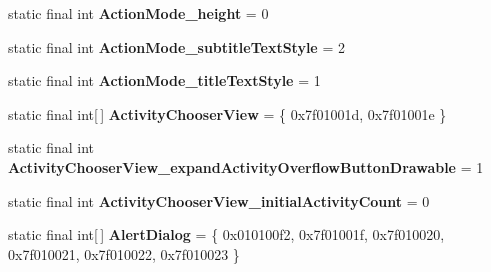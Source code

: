 \begin{DoxyCompactItemize}
\item 
\hypertarget{classandroid_1_1support_1_1design_1_1_r_1_1styleable_a14760d08c455c5f160e63389c6e0a2a8}{}static final int {\bfseries Action\+Mode\+\_\+height} = 0\label{classandroid_1_1support_1_1design_1_1_r_1_1styleable_a14760d08c455c5f160e63389c6e0a2a8}

\item 
\hypertarget{classandroid_1_1support_1_1design_1_1_r_1_1styleable_a10bc3c198873b4b55ca3d7a3a03b0b3d}{}static final int {\bfseries Action\+Mode\+\_\+subtitle\+Text\+Style} = 2\label{classandroid_1_1support_1_1design_1_1_r_1_1styleable_a10bc3c198873b4b55ca3d7a3a03b0b3d}

\item 
\hypertarget{classandroid_1_1support_1_1design_1_1_r_1_1styleable_a00160252e8c184b0cb941db7fa9b3422}{}static final int {\bfseries Action\+Mode\+\_\+title\+Text\+Style} = 1\label{classandroid_1_1support_1_1design_1_1_r_1_1styleable_a00160252e8c184b0cb941db7fa9b3422}

\item 
\hypertarget{classandroid_1_1support_1_1design_1_1_r_1_1styleable_a793c8e02386efdda6b3cf815e635b3fe}{}static final int\mbox{[}$\,$\mbox{]} {\bfseries Activity\+Chooser\+View} = \{ 0x7f01001d, 0x7f01001e \}\label{classandroid_1_1support_1_1design_1_1_r_1_1styleable_a793c8e02386efdda6b3cf815e635b3fe}

\item 
\hypertarget{classandroid_1_1support_1_1design_1_1_r_1_1styleable_a0f59ec2d875fa33d8606d30a159009e2}{}static final int {\bfseries Activity\+Chooser\+View\+\_\+expand\+Activity\+Overflow\+Button\+Drawable} = 1\label{classandroid_1_1support_1_1design_1_1_r_1_1styleable_a0f59ec2d875fa33d8606d30a159009e2}

\item 
\hypertarget{classandroid_1_1support_1_1design_1_1_r_1_1styleable_ac585173d17be15bb17e5558aecd007fc}{}static final int {\bfseries Activity\+Chooser\+View\+\_\+initial\+Activity\+Count} = 0\label{classandroid_1_1support_1_1design_1_1_r_1_1styleable_ac585173d17be15bb17e5558aecd007fc}

\item 
\hypertarget{classandroid_1_1support_1_1design_1_1_r_1_1styleable_aeccb758d25f6e242e6f3a23f3873ec21}{}static final int\mbox{[}$\,$\mbox{]} {\bfseries Alert\+Dialog} = \{ 0x010100f2, 0x7f01001f, 0x7f010020, 0x7f010021, 0x7f010022, 0x7f010023 \}\label{classandroid_1_1support_1_1design_1_1_r_1_1styleable_aeccb758d25f6e242e6f3a23f3873ec21}


\end{DoxyCompactItemize}
